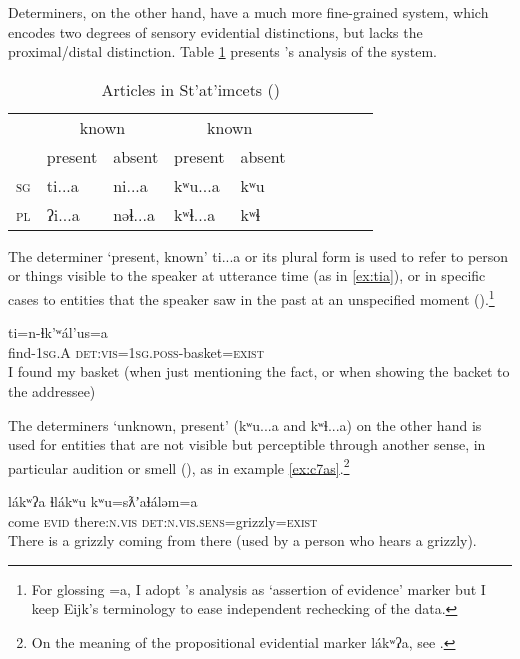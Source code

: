 \documentclass[oneside,a4paper,11pt]{article}
\newcommand{\ipa}[1]{{\phon \mbox{#1}}} %
\begin{document}
Determiners, on the other hand, have a much more fine-grained system, which encodes two degrees of sensory  evidential distinctions, but lacks the proximal/distal distinction. Table \ref{tab:statimcets.det}  presents \citet{eijk97lillooet}'s analysis of the system. 

 \begin{table}[H]
\caption{Articles in St'at'imcets (\citealt[192]{eijk97lillooet})} \label{tab:statimcets.det} \centering 
\begin{tabular}{l|lllllllll}
\toprule
& \multicolumn{2}{c}{known} &\multicolumn{2}{c}{known} \\
& present & absent & present & absent \\
\midrule
\textsc{sg} & \ipa{ti...a} & \ipa{ni...a} & \ipa{kʷu...a} &\ipa{kʷu} \\
\textsc{pl} &  \ipa{ʔi...a} & \ipa{nəɬ...a} & \ipa{kʷɬ...a} &\ipa{kʷɬ} \\
\bottomrule
\end{tabular}
\end{table}
 
 The determiner `present, known' \ipa{ti...a} or its plural form is used to refer to person or things visible to the speaker at utterance time (as in \ref{ex:tia}), or in specific cases to entities that the speaker saw in the past at an unspecified moment (\citealt[193]{eijk97lillooet}).\footnote{For glossing \ipa{=a}, I adopt \citet{matthewson98determiners}'s analysis as `assertion of evidence' marker but I keep Eijk's terminology to ease independent rechecking of the data. }
 
\begin{exe}
\ex \label{ex:tia}
\gll \ipa{pún-ɬkan} 	\ipa{ti=n-ɬk'ʷál'us=a} \\
find-\textsc{1sg.A} \textsc{det:vis=1sg.poss}-basket=\textsc{exist} \\
\glt I found my basket (when just mentioning the fact, or when showing the backet to the addressee)
\end{exe}

The determiners `unknown, present' (\ipa{kʷu...a} and \ipa{kʷɬ...a}) on the other hand is used for entities that are not visible but perceptible through another sense, in particular audition or smell (\citealt[195]{eijk97lillooet}), as in example \ref{ex:c7as}.\footnote{On the meaning of the propositional evidential marker 	\ipa{lákʷʔa}, see \citet{matthewson10lakw7a}.}

\begin{exe}
\ex \label{ex:c7as}
\gll \ipa{cʔas} 	\ipa{lákʷʔa} 	\ipa{ɬlákʷu} 	\ipa{kʷu=sƛʼaɬáləm=a} \\
 come \textsc{evid} there:\textsc{n.vis} \textsc{det:n.vis.sens}=grizzly=\textsc{exist} \\
\glt There is a grizzly coming from there (used by a person who hears a grizzly).
\end{exe}
\end{document}
